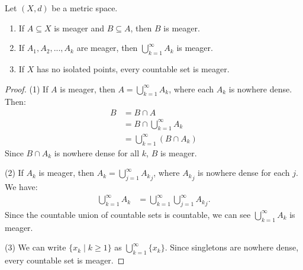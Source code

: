     \begin{proposition}
        Let $(X,d)$ be a metric space.
        \begin{enumerate}[label = (\arabic*),itemsep=1pt,topsep=3pt]
            \item If $A \subseteq X$ is meager and $B \subseteq A$, then $B$ is meager.
            \item If $A_1,A_2,...,A_k$ are meager, then $\bigcup_{k = 1}^\infty A_k$ is meager.
            \item If $X$ has no isolated points, every countable set is meager.
        \end{enumerate}
    \end{proposition}
        \begin{proof}
            (1) If $A$ is meager, then $A = \bigcup_{k = 1}^\infty A_k$, where each $A_k$ is nowhere dense. Then:
                \begin{equation*}
                \begin{split}
                    B 
                    & = B \cap A \\
                    & = B \cap \bigcup_{k = 1}^\infty A_k \\
                    & = \bigcup_{k = 1}^\infty (B \cap A_k)
                \end{split}
                \end{equation*}
            Since $B \cap A_k$ is nowhere dense for all $k$, $B$ is meager.

            (2) If $A_k$ is meager, then $A_k = \bigcup_{j = 1}^\infty {A_k}_j$, where ${A_k}_j$ is nowhere dense for each $j$. We have:
                \begin{equation*}
                \begin{split}
                    \bigcup_{k = 1}^\infty A_k 
                    & = \bigcup_{k = 1}^\infty \bigcup_{j = 1}^\infty {A_k}_j.
                \end{split}
                \end{equation*}
            Since the countable union of countable sets is countable, we can see $\bigcup_{k = 1}^\infty A_k$ is meager.

            (3) We can write $\{x_k \mid k \geq 1\}$ as $\bigcup_{k = 1}^\infty \{x_k\}$. Since singletons are nowhere dense, every countable set is meager.
        \end{proof}

